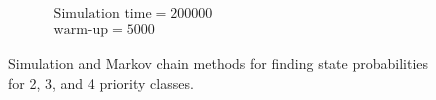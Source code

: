 \documentclass{article}
\begin{document}
\begin{figure}[h!]
\begin{center}
\begin{subfigure}[b]{\textwidth}
{        $\begin{array}{c}\text{Simulation time} = 200000\\\text{warm-up} = 5000\end{array}$
    }
  \end{subfigure}
  \caption{Simulation and Markov chain methods for finding state probabilities
  for 2, 3, and 4 priority classes.}
  \end{center}
\end{figure}
\end{document}

